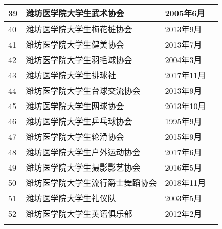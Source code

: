 \begin{table}[H]
\begin{tabular}{|>{\centering\arraybackslash}p{2em}|>{\centering\arraybackslash}p{21em}|%
        >{\centering\arraybackslash}p{6em}|>{\centering\arraybackslash}p{5em}|}
        \cline{1-3}
        39 & 潍坊医学院大学生武术协会     & 2005年6月  &                         \\
        \cline{1-3}
        40 & 潍坊医学院大学生梅花桩协会    & 2013年9月  &                         \\
        \cline{1-3}
        41 & 潍坊医学院大学生健美协会     & 2013年7月  &                         \\
        \cline{1-3}
        42 & 潍坊医学院大学生羽毛球协会    & 2004年3月  &                         \\
        \cline{1-3}
        43 & 潍坊医学院大学生排球社      & 2017年11月 &                         \\
        \cline{1-3}
        44 & 潍坊医学院大学生台球交流协会   & 2013年9月  &                         \\
        \cline{1-3}
        45 & 潍坊医学院大学生网球协会     & 2013年10月 &                         \\
        \cline{1-3}
        46 & 潍坊医学院大学生乒乓球协会    & 1995年9月  &                         \\
        \cline{1-3}
        47 & 潍坊医学院大学生轮滑协会     & 2015年9月  &                         \\
        \cline{1-3}
        48 & 潍坊医学院大学生户外运动协会   & 2017年6月  &                         \\
        \cline{1-3}
        49 & 潍坊医学院大学生摄影影艺协会   & 2016年5月  &                         \\
        \cline{1-3}
        50 & 潍坊医学院大学生流行爵士舞蹈协会 & 2018年11月 &                         \\
        \cline{1-3}
        51 & 潍坊医学院大学生礼仪队      & 2003年5月  &                         \\
        \cline{1-3}
        52 & 潍坊医学院大学生英语俱乐部    & 2012年2月  &                         \\
        \Xhline{1.2pt}
    \end{tabular}
\end{table}
